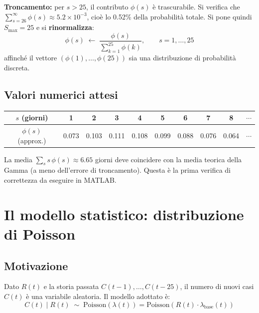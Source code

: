 \documentclass[12pt,a4paper]{article}
\newcommand{\lbase}{\lambda_{\mathrm{base}}}
\newcommand{\Smax}{S_{\max}}
\begin{document}
\textbf{Troncamento:} per $s > 25$, il contributo $\phi(s)$ è trascurabile. Si verifica
che $\sum_{s=26}^\infty \phi(s) \approx 5.2 \times 10^{-3}$, cioè lo 0.52\% della
probabilità totale. Si pone quindi $\Smax = 25$ e si \textbf{rinormalizza}:
\begin{equation}
  \phi(s) \;\leftarrow\; \frac{\phi(s)}{\sum_{k=1}^{25} \phi(k)}, \qquad s = 1, \ldots, 25
\end{equation}
affinché il vettore $(\phi(1), \ldots, \phi(25))$ sia una distribuzione di probabilità discreta.

\subsection{Valori numerici attesi}

\begin{center}
\begin{tabular}{cccccccccc}
\toprule
$s$ (giorni) & 1 & 2 & 3 & 4 & 5 & 6 & 7 & 8 & $\cdots$ \\
\midrule
$\phi(s)$ (approx.) & 0.073 & 0.103 & 0.111 & 0.108 & 0.099 & 0.088 & 0.076 & 0.064 & $\cdots$ \\
\bottomrule
\end{tabular}
\end{center}

La media $\sum_s s\,\phi(s) \approx 6.65$ giorni deve coincidere con la media teorica
della Gamma (a meno dell'errore di troncamento). Questa è la prima verifica di
correttezza da eseguire in MATLAB.

\section{Il modello statistico: distribuzione di Poisson}

\subsection{Motivazione}

Dato $R(t)$ e la storia passata $C(t-1), \ldots, C(t-25)$, il numero di nuovi casi
$C(t)$ è una variabile aleatoria. Il modello adottato è:
\begin{equation}
  C(t) \mid R(t) \;\sim\; \mathrm{Poisson}\!\left(\lambda(t)\right) = \mathrm{Poisson}\!\left(R(t)\cdot\lbase(t)\right)
  \label{eq:poisson}
\end{equation}
\end{document}
